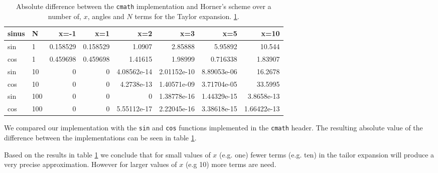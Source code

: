 \documentclass[paper=a4, fontsize=11pt]{article} %
\begin{document}
\begin{table}[H]
\begin{tabular}{ l | l | r r r r r r}
  sinus & N   & x=-1     & x=1      & x=2         & x=3         & x=5         & x=10        \\
  \hline
  sin   & 1   & 0.158529 & 0.158529 & 1.0907      & 2.85888     & 5.95892     & 10.544      \\
  cos   & 1   & 0.459698 & 0.459698 & 1.41615     & 1.98999     & 0.716338    & 1.83907     \\
  sin   & 10  & 0        & 0        & 4.08562e-14 & 2.01152e-10 & 8.89053e-06 & 16.2678     \\
  cos   & 10  & 0        & 0        & 4.2738e-13  & 1.40571e-09 & 3.71704e-05 & 33.5995     \\
  sin   & 100 & 0        & 0        & 0           & 1.38778e-16 & 1.44329e-15 & 3.8658e-13  \\
  cos   & 100 & 0        & 0        & 5.55112e-17 & 2.22045e-16 & 3.38618e-15 & 1.66422e-13 \\
\end{tabular}
\caption{ Absolute difference between the \lstinline$cmath$
  implementation and Horner's scheme over a number of, $x$, angles and
  $N$ terms for the Taylor expansion.  \ref{tab:t1-errors}.}
\label{tab:t1-errors}
\end{table}


We compared our implementation with the \lstinline$sin$ and
\lstinline$cos$ functions implemented in the \lstinline$cmath$
header. The resulting absolute value of the difference between the
implementations can be seen in table \ref{tab:t1-errors}.

Based on the results in table \ref{tab:t1-errors} we conclude that for
small values of $x$ (e.g. one) fewer terms (e.g. ten) in the tailor
expansion will produce a very precise approximation. However for
larger values of $x$ (e.g 10) more terms are need.
\end{document}
